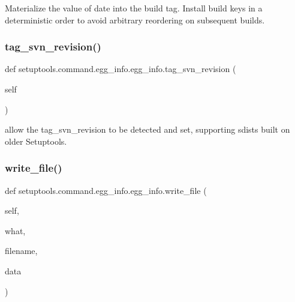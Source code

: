 \begin{DoxyVerb}Materialize the value of date into the
build tag. Install build keys in a deterministic order
to avoid arbitrary reordering on subsequent builds.
\end{DoxyVerb}
 \mbox{\label{classsetuptools_1_1command_1_1egg__info_1_1egg__info_a61a0f30d01ed01debb3448ea1e48208f}} 
\subsubsection{\texorpdfstring{tag\+\_\+svn\+\_\+revision()}{tag\_svn\_revision()}}
{\footnotesize\ttfamily def setuptools.\+command.\+egg\+\_\+info.\+egg\+\_\+info.\+tag\+\_\+svn\+\_\+revision (\begin{DoxyParamCaption}\item[{}]{self }\end{DoxyParamCaption})}



allow the \textquotesingle{}tag\+\_\+svn\+\_\+revision\textquotesingle{} to be detected and set, supporting sdists built on older Setuptools. 

\mbox{\label{classsetuptools_1_1command_1_1egg__info_1_1egg__info_a7f78ac9292da94a3f8e82b9fa1027472}} 
\subsubsection{\texorpdfstring{write\+\_\+file()}{write\_file()}}
{\footnotesize\ttfamily def setuptools.\+command.\+egg\+\_\+info.\+egg\+\_\+info.\+write\+\_\+file (\begin{DoxyParamCaption}\item[{}]{self,  }\item[{}]{what,  }\item[{}]{filename,  }\item[{}]{data }\end{DoxyParamCaption})}

